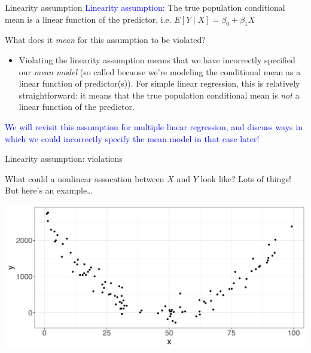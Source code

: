 \documentclass[10pt,t]{beamer}
\begin{document}
\begin{frame}{Linearity assumption}
\textcolor{blue}{Linearity assumption}: The true population conditional mean is a linear function of the predictor, i.e. $E[Y \mid X] = \beta_0 + \beta_1 X$

\vspace{0.3cm}

What does it \textit{mean} for this assumption to be violated?

\vspace{0.3cm}

\begin{itemize}
	\item[] Violating the linearity assumption means that we have incorrectly specified our \textit{mean model} (so called because we're modeling the conditional mean as a linear function of predictor(s)). For simple linear regression, this is relatively straightforward: it means that the true population conditional mean is \textit{not} a linear function of the predictor.
\end{itemize}

\vspace{0.3cm}

 \textcolor{blue}{We will revisit this assumption for multiple linear regression, and discuss ways in which we could incorrectly specify the mean model in that case later!}

\end{frame}

\begin{frame}{Linearity assumption: violations}

What could a nonlinear assocation between $X$ and $Y$ look like? Lots of things! But here's an example\dots

\vspace{0.3cm}

\centering \includegraphics[scale=0.4]{quadratic.png}

\end{frame}
\end{document}
